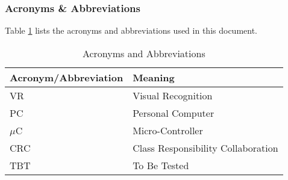 \documentclass[titlepage]{article}
\begin{document}
\subsubsection{Acronyms \& Abbreviations}
Table \ref{tab:Acronyms} lists the acronyms and abbreviations used in this document.
\begin{table}[h!]
\centering
\begin{tabular}{| p{6cm} | p{6cm} |}\hline
	\textbf{Acronym/Abbreviation}	&\textbf{Meaning}\\\hline
	VR								&Visual Recognition\\\hline
	PC								&Personal Computer\\\hline
	$\mu$C							&Micro-Controller\\\hline
	CRC								&Class Responsibility Collaboration\\\hline
	TBT								&To Be Tested\\\hline
\end{tabular}
\caption{Acronyms and Abbreviations}
\label{tab:Acronyms}
\end{table}
\newpage
\end{document}

